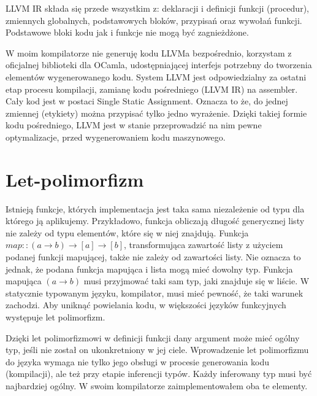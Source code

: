 \documentclass[declaration,shortabstract]{iithesis}
\begin{document}
LLVM IR składa się przede wszystkim z: deklaracji i definicji funkcji
(procedur), zmiennych globalnych, podstawowych bloków, przypisań oraz 
wywołań funkcji. Podstawowe bloki kodu jak i funkcje nie 
mogą być zagnieżdżone. 

W moim kompilatorze nie generuję kodu LLVMa bezpośrednio, 
korzystam z oficjalnej biblioteki dla OCamla, 
udostępniającej interfejs potrzebny do tworzenia elementów wygenerowanego kodu. 
System LLVM 
jest odpowiedzialny za ostatni etap procesu kompilacji, zamianę kodu 
pośredniego (LLVM IR) 
na assembler. Cały kod jest w postaci Single Static Assignment. Oznacza to że, 
do jednej zmiennej (etykiety) można przypisać tylko jedno wyrażenie. 
Dzięki takiej formie kodu pośredniego, LLVM jest w 
stanie przeprowadzić na nim pewne optymalizacje, przed wygenerowaniem kodu 
maszynowego. 



\section{Let-polimorfizm}

Istnieją funkcje, których implementacja jest taka sama niezależenie od typu dla
którego ją aplikujemy. Przykładowo, funkcja obliczają długość generycznej 
listy nie zależy od typu elementów, które się w niej znajdują. 
Funkcja $map :: (a \rightarrow b) \rightarrow [a] \rightarrow [b]$, 
transformująca zawartość listy 
z użyciem podanej funkcji mapującej, także nie zależy od zawartości listy. Nie 
oznacza to jednak, że podana funkcja mapująca i lista mogą mieć dowolny typ. 
Funkcja mapująca $(a \rightarrow b)$ musi przyjmować taki sam typ, jaki 
znajduje się w liście. W statycznie typowanym języku, kompilator, musi mieć 
pewność, że taki warunek zachodzi. Aby uniknąć powielania kodu, w większości 
języków funkcyjnych 
występuje let polimorfizm. 

Dzięki let polimorfizmowi w definicji funkcji dany argument może 
mieć ogólny typ, jeśli nie został on ukonkretniony w jej ciele.
Wprowadzenie let polimorfizmu do języka wymaga nie tylko jego obsługi 
w procesie generowania kodu (kompilacji), ale też przy etapie inferencji typów.
Każdy inferowany typ musi być najbardziej ogólny. W swoim kompilatorze 
zaimplementowałem oba te elementy. 
\end{document}
